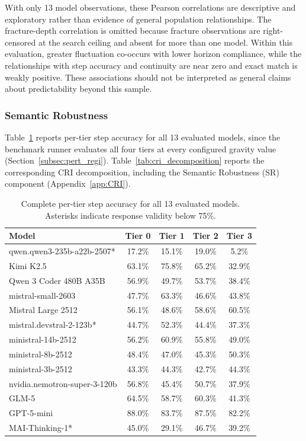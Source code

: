\documentclass{article}
\begin{document}
With only 13 model observations, these Pearson correlations are descriptive and exploratory rather than evidence of general population relationships. The fracture-depth correlation is omitted because fracture observations are right-censored at the search ceiling and absent for more than one model. Within this evaluation, greater fluctuation co-occurs with lower horizon compliance, while the relationships with step accuracy and continuity are near zero and exact match is weakly positive. These associations should not be interpreted as general claims about predictability beyond this sample.

\subsubsection{Semantic Robustness}

Table~\ref{tab:tier_full} reports per-tier step accuracy for all 13 evaluated models, since the benchmark runner evaluates all four tiers at every configured gravity value (Section~\ref{subsec:pert_regi}). Table~\ref{tab:cri_decomposition} reports the corresponding CRI decomposition, including the Semantic Robustness (SR) component (Appendix~\ref{app:CRI}).

\begin{table}[!ht]
\centering
\caption{Complete per-tier step accuracy for all 13 evaluated models. Asterisks indicate response validity below 75\%.}
\label{tab:tier_full}
\scriptsize
\begin{tabular}{lcccc}
\toprule
\textbf{Model} & \textbf{Tier 0} & \textbf{Tier 1} & \textbf{Tier 2} & \textbf{Tier 3} \\
\midrule
qwen.qwen3-235b-a22b-2507* & 17.2\% & 15.1\% & 19.0\% & 5.2\% \\
Kimi K2.5 & 63.1\% & 75.8\% & 65.2\% & 32.9\% \\
Qwen 3 Coder 480B A35B & 56.9\% & 49.7\% & 53.7\% & 38.4\% \\
mistral-small-2603 & 47.7\% & 63.3\% & 46.6\% & 43.8\% \\
Mistral Large 2512 & 56.1\% & 48.6\% & 58.6\% & 60.5\% \\
mistral.devstral-2-123b* & 44.7\% & 52.3\% & 44.4\% & 37.3\% \\
ministral-14b-2512 & 56.2\% & 60.9\% & 55.8\% & 49.0\% \\
ministral-8b-2512 & 48.4\% & 47.0\% & 45.3\% & 50.3\% \\
ministral-3b-2512 & 43.3\% & 44.3\% & 42.7\% & 44.3\% \\
nvidia.nemotron-super-3-120b & 56.8\% & 45.4\% & 50.7\% & 37.9\% \\
GLM-5 & 64.5\% & 58.7\% & 60.3\% & 41.3\% \\
GPT-5-mini & 88.0\% & 83.7\% & 87.5\% & 82.2\% \\
MAI-Thinking-1* & 45.0\% & 29.1\% & 46.7\% & 39.2\% \\
\bottomrule
\end{tabular}
\end{table}
\end{document}
